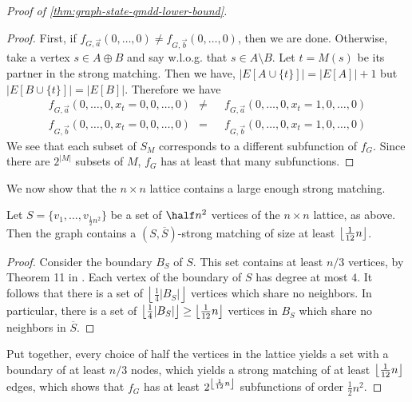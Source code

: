 \begin{proof}[Proof of \autoref{thm:graph-state-qmdd-lower-bound}]
\begin{proof}
	First, if $f_{G,\vec{a}}(0,\ldots, 0)\ne f_{G,\vec{b}}(0,\ldots, 0)$, then we are done.
	Otherwise, take a vertex $s\in A\oplus B$
    and say w.l.o.g. that $s\in A\setminus B$.
	Let $t=M(s)$ be its partner in the strong matching.
	Then we have, $|E[A\cup \{t\}]| = |E[A]|+1$ but $|E[B\cup \{t\}]|=|E[B]|$.
	Therefore we have 
	\begin{align}
	f_{G,\vec a}(0,\ldots, 0, x_t=0, 0,\ldots, 0) ~~\ne~~ &f_{G,\vec a}(0,\ldots,0,x_t=1,0,\ldots, 0) \\
	f_{G,\vec b}(0,\ldots, 0, x_t=0, 0,\ldots, 0) ~~=~~ & f_{G,\vec b}(0,\ldots, 0,x_t=1,0,\ldots, 0)
	\end{align}
	We see that each subset of $S_M$ corresponds to a different subfunction of $f_G$. Since there are $2^{|M|}$ subsets of $M$, $f_G$ has at least that many subfunctions.
\end{proof}

We now show that the $n\times n$ lattice contains a large enough strong matching.

\begin{lemma}
	\label{thm:large-strong-matching}
	Let $S=\{v_1,\ldots, v_{\frac{1}{2} n^2}\}$ be a set of $\half n^2$ vertices of the $n\times n$ lattice, as above.
	Then the graph contains a $(S,\overline S)$-strong matching of size at least $\left\lfloor \frac{1}{12}n \right\rfloor$.
\end{lemma}
\begin{proof}
	Consider the boundary $B_S$ of $S$.
	This set contains at least $n/3$ vertices, by Theorem 11 in \cite{lipton1979generalized}.
	Each vertex of the boundary of $S$ has degree at most $4$. 
    It follows that there is a set of $\left\lfloor \frac{1}{4}|B_S|\right\rfloor$ vertices which share no neighbors.
	In particular, there is a set of $\left\lfloor \frac{1}{4}|B_S| \right\rfloor\geq \left\lfloor \frac{1}{12}n \right\rfloor$ vertices in $B_S$ which share no neighbors in $\overline S$.
\end{proof}
Put together, every choice of half the vertices in the lattice yields a set with a boundary of at least $n/3$ nodes, which yields a strong matching of at least $\left\lfloor \frac{1}{12}n \right\rfloor$ edges, which shows that $f_G$ has at least $2^{\left\lfloor \frac{1}{12}n \right\rfloor}$ subfunctions of order $\frac{1}{2}n^2$.
\end{proof}

